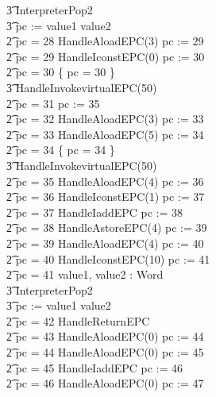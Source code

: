 \begin{figure}[p!]
\begin{minipage}{0.5\textwidth}
{\begin{circus}
    \t3 InterpreterPop2 \circseq \\
    \t3 pc := \IF value1 \leq value2   \\
    \t2 {} \circelse pc = 28 \circthen HandleAloadEPC(3) \circseq pc := 29 \\
    \t2 {} \circelse pc = 29 \circthen HandleIconstEPC(0) \circseq pc := 30 \\
    \t2 {} \circelse pc = 30 \circthen \{ pc = 30 \} \circseq \\
    \t3 HandleInvokevirtualEPC(50) \\
    \t2 {} \circelse pc = 31 \circthen pc := 35 \\
    \t2 {} \circelse pc = 32 \circthen HandleAloadEPC(3) \circseq pc := 33 \\
    \t2 {} \circelse pc = 33 \circthen HandleAloadEPC(5) \circseq pc := 34 \\
    \t2 {} \circelse pc = 34 \circthen \{ pc = 34 \} \circseq \\
    \t3 HandleInvokevirtualEPC(50) \\
    \t2 {} \circelse pc = 35 \circthen HandleAloadEPC(4) \circseq pc := 36 \\
    \t2 {} \circelse pc = 36 \circthen HandleIconstEPC(1) \circseq pc := 37 \\
    \t2 {} \circelse pc = 37 \circthen HandleIaddEPC \circseq pc := 38 \\
    \t2 {} \circelse pc = 38 \circthen HandleAstoreEPC(4) \circseq pc := 39 \\
    \t2 {} \circelse pc = 39 \circthen HandleAloadEPC(4) \circseq pc := 40 \\
    \t2 {} \circelse pc = 40 \circthen HandleIconstEPC(10) \circseq pc := 41 \\
    \t2 {} \circelse pc = 41 \circthen \circvar value1, value2 : Word \circspot \\
    \t3 InterpreterPop2 \circseq \\
    \t3 pc := \IF value1 \leq value2   \\
    \t2 {} \circelse pc = 42 \circthen HandleReturnEPC \\
    \t2 {} \circelse pc = 43 \circthen HandleAloadEPC(0) \circseq pc := 44 \\
    \t2 {} \circelse pc = 44 \circthen HandleAloadEPC(0) \circseq pc := 45 \\
    \t2 {} \circelse pc = 45 \circthen HandleIaddEPC \circseq pc := 46 \\
    \t2 {} \circelse pc = 46 \circthen HandleAloadEPC(0) \circseq pc := 47 \\

\end{circus}}
\end{minipage}
\end{figure}
